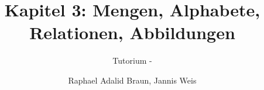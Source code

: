 \documentclass[18pt]{beamer}
\title[Mengen, Alphabete...]{Kapitel 3: Mengen, Alphabete, Relationen, Abbildungen}
\subtitle{Tutorium - } %
\author{Raphael Adalid Braun, Jannis Weis}
\institute{Grundbegriffe der Informatik | WS 2018/19}
\begin{document}

\begin{frame}
 \titlepage
\end{frame}

\def\showSolutions{1}					 %

\title[Mengen]{}

\title[Alphabete]{}

\title[Relationen]{}

\title[Abbildungen]{}

\title[Mehr Mengen & Relationen]{}

\end{document}
